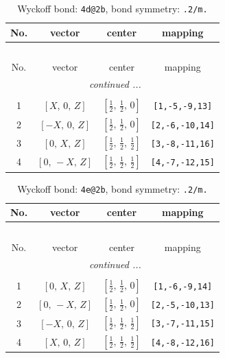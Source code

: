 \documentclass[fleqn,8pt]{jsarticle}
\begin{document}
\begin{longtable}{cccc}
\caption{Wyckoff bond: {\tt 4d@2b}, bond symmetry: {\tt .2/m.}}
 \\
 \hline \hline
No. & vector & center & mapping \\ \hline \endfirsthead

\multicolumn{3}{l}{\tablename\ \thetable{}} \\
 \hline \hline
No. & vector & center & mapping \\ \hline \endhead

 \hline \hline
\multicolumn{3}{r}{\footnotesize\it continued ...} \\ \endfoot

 \hline \hline
\multicolumn{3}{r}{} \\ \endlastfoot

1 & $\left[ X,\, 0,\, Z \right]$ & $\left[ \frac{1}{2},\, \frac{1}{2},\, 0 \right]$ & {\tt [1,-5,-9,13]} \\ \hline
2 & $\left[ - X,\, 0,\, Z \right]$ & $\left[ \frac{1}{2},\, \frac{1}{2},\, 0 \right]$ & {\tt [2,-6,-10,14]} \\ \hline
3 & $\left[ 0,\, X,\, Z \right]$ & $\left[ \frac{1}{2},\, \frac{1}{2},\, \frac{1}{2} \right]$ & {\tt [3,-8,-11,16]} \\ \hline
4 & $\left[ 0,\, - X,\, Z \right]$ & $\left[ \frac{1}{2},\, \frac{1}{2},\, \frac{1}{2} \right]$ & {\tt [4,-7,-12,15]} \\
\end{longtable}
\renewcommand{\arraystretch}{1.2}
\begin{longtable}{cccc}
\caption{Wyckoff bond: {\tt 4e@2b}, bond symmetry: {\tt .2/m.}}
 \\
 \hline \hline
No. & vector & center & mapping \\ \hline \endfirsthead

\multicolumn{3}{l}{\tablename\ \thetable{}} \\
 \hline \hline
No. & vector & center & mapping \\ \hline \endhead

 \hline \hline
\multicolumn{3}{r}{\footnotesize\it continued ...} \\ \endfoot

 \hline \hline
\multicolumn{3}{r}{} \\ \endlastfoot

1 & $\left[ 0,\, X,\, Z \right]$ & $\left[ \frac{1}{2},\, \frac{1}{2},\, 0 \right]$ & {\tt [1,-6,-9,14]} \\ \hline
2 & $\left[ 0,\, - X,\, Z \right]$ & $\left[ \frac{1}{2},\, \frac{1}{2},\, 0 \right]$ & {\tt [2,-5,-10,13]} \\ \hline
3 & $\left[ - X,\, 0,\, Z \right]$ & $\left[ \frac{1}{2},\, \frac{1}{2},\, \frac{1}{2} \right]$ & {\tt [3,-7,-11,15]} \\ \hline
4 & $\left[ X,\, 0,\, Z \right]$ & $\left[ \frac{1}{2},\, \frac{1}{2},\, \frac{1}{2} \right]$ & {\tt [4,-8,-12,16]} \\
\end{longtable}
\end{document}
